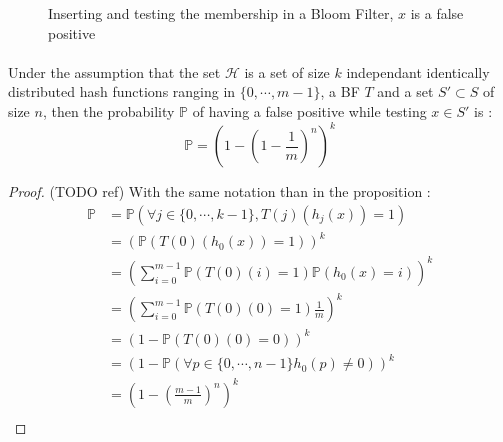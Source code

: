 \begin{figure}[H]
\caption{Inserting and testing the membership in a Bloom Filter, $x$ is a false positive} \label{fig:fp}
\end{figure}
\paragraph{}
\begin{proposition}
 Under the assumption that the set $\mathcal H$ is a set of size $k$ independant identically distributed hash functions ranging in $\{0,\cdots,m-1\}$, a BF $T$ and a set $S'\subset S$  of size $n$, then the probability $\mathbb{P}$ of having a false positive while testing $x \in S'$ is :
 \[
  \mathbb{P}=\left ( 1 - \left ( 1 - \frac{1}{m} \right )^n \right )^k
 \]
\end{proposition}
\begin{proof}(TODO ref)
With the same notation than in the proposition :
 \begin{align*}
  \mathbb{P} &= \mathbb{P}(\forall j \in \{0,\cdots,k-1\}, T(j)(h_j(x)) = 1)\\
    &= \left ( \mathbb{P}(T(0)(h_0(x)) = 1) \right )^k\\
    &= \left ( \sum_{i=0}^{m-1} \mathbb{P}(T(0)(i) = 1)\mathbb{P}(h_0(x) = i)\right )^k\\
    &= \left ( \sum_{i=0}^{m-1} \mathbb{P}(T(0)(0) = 1)\frac{1}{m}\right )^k\\
    &= \left ( 1- \mathbb{P}(T(0)(0) = 0)\right )^k\\
    &= \left ( 1- \mathbb{P}(\forall p \in \{0,\cdots,n-1\} h_0(p) \neq 0 )\right )^k\\
    &= \left ( 1- \left ( \frac{m-1}{m} \right )^n \right )^k\\
 \end{align*}
\end{proof}
